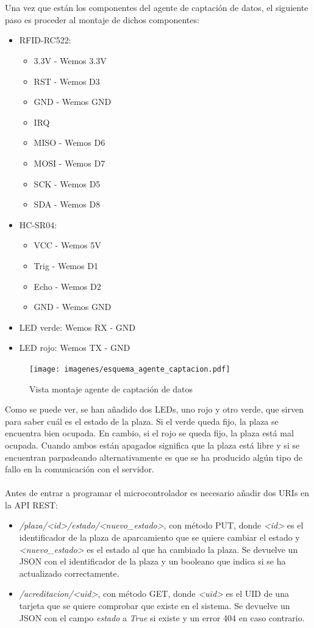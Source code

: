 \\\\
Una vez que están los componentes del agente de captación de datos, el siguiente paso es proceder al montaje de dichos componentes:
\begin{itemize}
	\item RFID-RC522:
	\begin{itemize}
		\item 3.3V - Wemos 3.3V
		\item RST  - Wemos D3
		\item GND  - Wemos GND
		\item IRQ
		\item MISO - Wemos D6
		\item MOSI - Wemos D7
		\item SCK  - Wemos D5
		\item SDA  - Wemos D8
	\end{itemize}
	\item HC-SR04:
	\begin{itemize}
		\item VCC  - Wemos 5V
		\item Trig - Wemos D1
		\item Echo - Wemos D2
		\item GND  - Wemos GND
	\end{itemize}
	\item LED verde: Wemos RX - GND
	\item LED rojo: Wemos TX - GND
\end{itemize}
\begin{figure}[H]
	\centering
	\texttt{[image: imagenes/esquema\_agente\_captacion.pdf]}
	\caption{Vista montaje agente de captación de datos}
	\label{esquema-agente-captacion}
\end{figure}
Como se puede ver, se han añadido dos LEDs, uno rojo y otro verde, que sirven para saber cuál es el estado de la plaza. Si el verde queda fijo, la plaza se encuentra bien ocupada. En cambio, si el rojo se queda fijo, la plaza está mal ocupada. Cuando ambos están apagados significa que la plaza está libre y si se encuentran parpadeando alternativamente es que se ha producido algún tipo de fallo en la comunicación con el servidor.
\\\\
Antes de entrar a programar el microcontrolador es necesario añadir dos URIs en la API REST:
\begin{itemize}
	\item \textit{/plaza/<id>/estado/<nuevo\_estado>}, con método PUT, donde \textit{<id>} es el identificador de la plaza de aparcamiento que se quiere cambiar el estado y \textit{<nuevo\_estado>} es el estado al que ha cambiado la plaza. Se devuelve un JSON con el identificador de la plaza y un booleano que indica si se ha actualizado correctamente.
	\item \textit{/acreditacion/<uid>}, con método GET, donde \textit{<uid>} es el UID de una tarjeta que se quiere comprobar que existe en el sistema. Se devuelve un JSON con el campo \textit{estado} a \textit{True} si existe y un error 404 en caso contrario.
\end{itemize}
